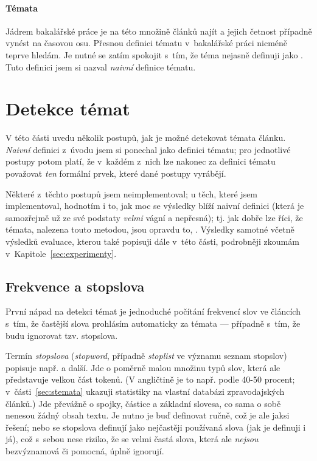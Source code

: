 \documentclass[12pt,a4paper]{report}
\begin{document}
\subsubsection{Témata}
\label{sec:sub_temata}
Jádrem bakalářské práce je na této množině článků najít  a jejich četnost případně vynést na časovou osu. Přesnou definici tématu v~bakalářské práci nicméně teprve hledám. Je nutné se zatím spokojit s~tím, že téma nejasně definuji jako . Tuto definici jsem si nazval \emph{naivní} definice tématu.


\chapter{Detekce témat}
\label{sec:hledanitemat_hlavni}
V této části uvedu několik postupů, jak je možné detekovat témata článku. \emph{Naivní} definici z~úvodu jsem si ponechal jako  definici tématu; pro jednotlivé postupy potom platí, že v~každém z~nich lze nakonec za definici tématu považovat \emph{ten} formální prvek, které dané postupy vyrábějí. 

Některé z~těchto postupů jsem neimplementoval; u těch, které jsem implementoval, hodnotím i to, jak moc se výsledky blíží naivní definici (která je samozřejmě už ze své podstaty \emph{velmi} vágní a nepřesná); tj. jak dobře lze říci, že témata, nalezena touto metodou, jsou opravdu to, . Výsledky samotné včetně výsledků evaluace, kterou také popisuji dále v~této části, podrobněji zkoumám v~Kapitole~\ref{sec:experimenty}.

\section{Frekvence a stopslova}
\label{sec:frekvestopslo}

První nápad na detekci témat je jednoduché počítání frekvencí slov ve článcích s~tím, že častější slova prohlásím automaticky za témata --- případně s~tím, že budu ignorovat tzv. stopslova.

Termín \emph{stopslova} (\emph{stopword}, případně \emph{stoplist} ve významu seznam stopslov) popisuje např. \cite{introduction} a další. Jde o po\-mě\-r\-ně ma\-lou mno\-ži\-nu ty\-pů slov, kte\-rá ale před\-sta\-vu\-je vel\-kou část to\-ke\-nů. (V angličtině je to např. po\-dle \cite{introduction} 40-50 pro\-cent; v~části~\ref{sec:stemata} ukazuji statistiky na vlastní databázi zpravodajských článků.) Jde převážně o spojky, částice a zá\-klad\-ní slovesa, co sama o sobě nenesou žádný obsah textu. Je nutno je buď definovat ručně, což je ale jaksi  řešení; nebo se stopslova definují jako nej\-čas\-tě\-ji po\-u\-ží\-va\-ná slo\-va (jak je definuji i já), což s~sebou ne\-se ri\-zi\-ko, že se vel\-mi čas\-tá slo\-va, kte\-rá ale \emph{ne\-jsou} bez\-vý\-zna\-mo\-vá či po\-moc\-ná, ú\-pl\-ně i\-gno\-ru\-jí.
\end{document}
